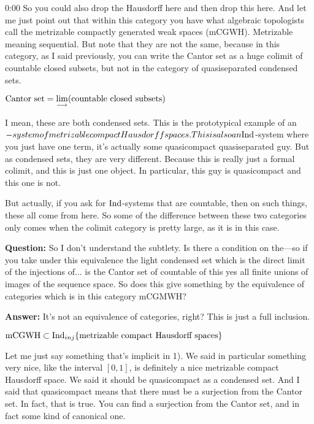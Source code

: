 \begin{unfinished}{0:00}
So you could also drop the Hausdorff here and then drop this here. And let me just point out that within this category you have what algebraic topologists call the metrizable compactly generated weak spaces (mCGWH). Metrizable meaning sequential. 
But note that they are not the same, because in this category, as I said previously, you can write the Cantor set as a huge colimit of countable closed subsets, but not in the category of quasiseparated condensed sets.

$\text{Cantor set} = \mathop{\operatorname*{lim}\limits_{\longrightarrow}}\limits (\text{countable closed subsets})$

I mean, these are both condensed sets. This is the prototypical example of an \Ind$-system of metrizable compact Hausdorff spaces. This is also an \mathrm{Ind}$-system where you just have one term, it's actually some quasicompact quasiseparated guy. But as condensed sets, they are very different. 
Because this is really just a formal colimit, and this is just one object. In particular, this guy is quasicompact and this one is not.

But actually, if you ask for $\mathrm{Ind}$-systems that are countable, then on such things, these all come from here. So some of the difference between these two categories only comes when the colimit category is pretty large, as it is in this case.

\textbf{Question:} So I don't understand the subtlety. Is there a condition on the---so if you take under this equivalence the light condensed set which is the direct limit of the injections of... is the Cantor set of countable of this yes all finite unions of images of the sequence space.
So does this give something by the equivalence of categories which is in this category mCGMWH? 

\textbf{Answer:} It's not an equivalence of categories, right? This is just a full inclusion. 

$\mathrm{mCGWH} \subset \mathrm{Ind}_{inj} \{ \text{metrizable compact Hausdorff spaces} \}$


Let me just say something that's implicit in 1). We said in particular something very nice, like the interval $[0,1]$, is definitely a nice metrizable compact Hausdorff space. We said it should be quasicompact as a condensed set. And I said that quasicompact means that there must be a surjection from the Cantor set. In fact, that is true. You can find a surjection from the Cantor set, and in fact some kind of canonical one.


\end{unfinished}
